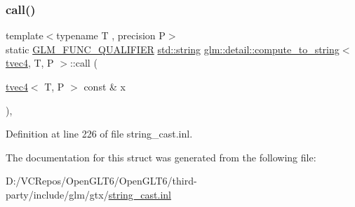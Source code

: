 \subsubsection{\texorpdfstring{call()}{call()}}
{\footnotesize\ttfamily template$<$typename T , precision P$>$ \\
static \mbox{\hyperlink{setup_8hpp_a33fdea6f91c5f834105f7415e2a64407}{G\+L\+M\+\_\+\+F\+U\+N\+C\+\_\+\+Q\+U\+A\+L\+I\+F\+I\+ER}} \mbox{\hyperlink{glad_8h_ac83513893df92266f79a515488701770}{std\+::string}} \mbox{\hyperlink{structglm_1_1detail_1_1compute__to__string}{glm\+::detail\+::compute\+\_\+to\+\_\+string}}$<$ \mbox{\hyperlink{structglm_1_1tvec4}{tvec4}}, T, P $>$\+::call (\begin{DoxyParamCaption}\item[{\mbox{\hyperlink{structglm_1_1tvec4}{tvec4}}$<$ T, P $>$ const \&}]{x }\end{DoxyParamCaption})\hspace{0.3cm}{\ttfamily [inline]}, {\ttfamily [static]}}



Definition at line 226 of file string\+\_\+cast.\+inl.



The documentation for this struct was generated from the following file\+:\begin{DoxyCompactItemize}
\item 
D\+:/\+V\+C\+Repos/\+Open\+G\+L\+T6/\+Open\+G\+L\+T6/third-\/party/include/glm/gtx/\mbox{\hyperlink{string__cast_8inl}{string\+\_\+cast.\+inl}}\end{DoxyCompactItemize}
